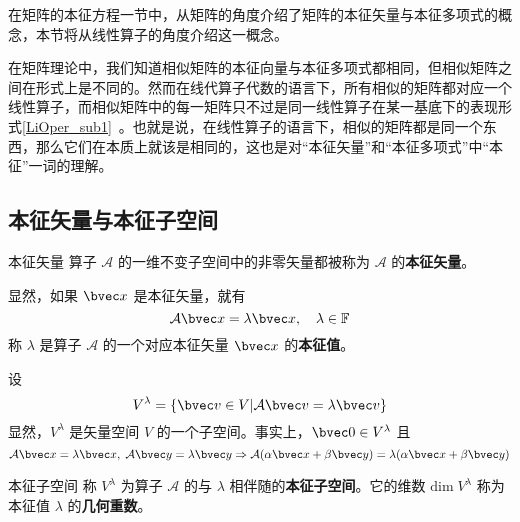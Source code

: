 在矩阵的本征方程一节中，从矩阵的角度介绍了矩阵的本征矢量与本征多项式的概念，本节将从线性算子的角度介绍这一概念。

在矩阵理论中，我们知道相似矩阵的本征向量与本征多项式都相同，但相似矩阵之间在形式上是不同的。然而在线代算子代数的语言下，所有相似的矩阵都对应一个线性算子，而相似矩阵中的每一矩阵只不过是同一线性算子在某一基底下的表现形式\autoref{LiOper_sub1}~。也就是说，在线性算子的语言下，相似的矩阵都是同一个东西，那么它们在本质上就该是相同的，这也是对“本征矢量”和“本征多项式”中“本征”一词的理解。

\subsection{本征矢量与本征子空间}
\begin{definition}{本征矢量}
算子 $\mathcal{A}$ 的一维不变子空间中的非零矢量都被称为 $\mathcal{A}$ 的\textbf{本征矢量}。
\end{definition}
显然，如果 $\bvec x$ 是本征矢量，就有
\begin{equation}\label{EigVM_eq1}
\mathcal{A}\bvec x=\lambda \bvec x,\quad \lambda\in\mathbb{F}
\end{equation}
称 $\lambda$ 是算子 $\mathcal{A}$ 的一个对应本征矢量 $\bvec x$ 的\textbf{本征值}。

设
\begin{equation}
V^{\lambda}=\{\bvec v\in V|\mathcal{A}\bvec v=\lambda \bvec v\}
\end{equation}
显然，$V^{\lambda}$ 是矢量空间 $V$ 的一个子空间。事实上，$\bvec 0\in V^{\lambda}$ 且
\begin{equation}
\mathcal{A}\bvec x=\lambda \bvec x,\;\mathcal{A}\bvec y=\lambda \bvec y\Rightarrow\mathcal{A}(\alpha\bvec x+\beta\bvec y)=\lambda(\alpha\bvec x+\beta \bvec y)
\end{equation}
\begin{definition}{本征子空间}\label{EigVM_def1}
称 $V^{\lambda}$ 为算子 $\mathcal{A}$ 的与 $\lambda$ 相伴随的\textbf{本征子空间}。它的维数 $\mathrm{dim}\;V^{\lambda}$ 称为本征值 $\lambda$ 的\textbf{几何重数}。 
\end{definition}
